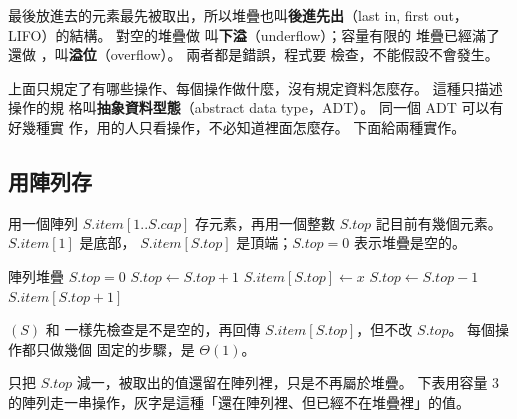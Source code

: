 最後放進去的元素最先被取出，所以堆疊也叫\textbf{後進先出}（last in, first out，
LIFO）的結構。 對空的堆疊做  叫\textbf{下溢}（underflow）；容量有限的
堆疊已經滿了還做 ，叫\textbf{溢位}（overflow）。 兩者都是錯誤，程式要
檢查，不能假設不會發生。

上面只規定了有哪些操作、每個操作做什麼，沒有規定資料怎麼存。 這種只描述操作的規
格叫\textbf{抽象資料型態}（abstract data type，ADT）。 同一個 ADT 可以有好幾種實
作，用的人只看操作，不必知道裡面怎麼存。 下面給兩種實作。

\subsection{用陣列存}

用一個陣列 $S.\mathit{item}[1..S.\mathit{cap}]$ 存元素，再用一個整數
$S.\mathit{top}$ 記目前有幾個元素。 $S.\mathit{item}[1]$ 是底部，
$S.\mathit{item}[S.\mathit{top}]$ 是頂端；$S.\mathit{top} = 0$ 表示堆疊是空的。

\begin{pseudo}[label=alg:sq-array-stack]{陣列堆疊}
    \State \Return $S.\mathit{top} = 0$
\EndFunction
\Statex
{}
        \State {}
    \EndIf
    \State $S.\mathit{top} \gets S.\mathit{top} + 1$
    \State $S.\mathit{item}[S.\mathit{top}] \gets x$
\EndProcedure
\Statex
{}
        \State {}
    \EndIf
    \State $S.\mathit{top} \gets S.\mathit{top} - 1$
    \State \Return $S.\mathit{item}[S.\mathit{top} + 1]$
\EndFunction
\end{pseudo}

$(S)$ 和  一樣先檢查是不是空的，再回傳
$S.\mathit{item}[S.\mathit{top}]$，但不改 $S.\mathit{top}$。 每個操作都只做幾個
固定的步驟，是 $\Theta(1)$。

 只把 $S.\mathit{top}$ 減一，被取出的值還留在陣列裡，只是不再屬於堆疊。
下表用容量 $3$ 的陣列走一串操作，灰字是這種「還在陣列裡、但已經不在堆疊裡」的值。

